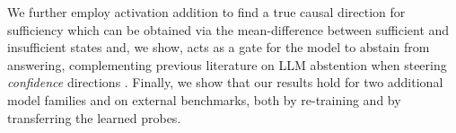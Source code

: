 We further employ activation addition \cite{ActivationSteering} to find a true causal direction for sufficiency which can be obtained via the mean-difference between sufficient and insufficient states and, we show, acts as a gate for the model to abstain  from answering, complementing previous literature on LLM abstention when steering \emph{confidence} directions \cite{Kumaran2026}. Finally, we show that our results hold for two additional model families and on external benchmarks, both by re-training and by transferring the learned probes. 

